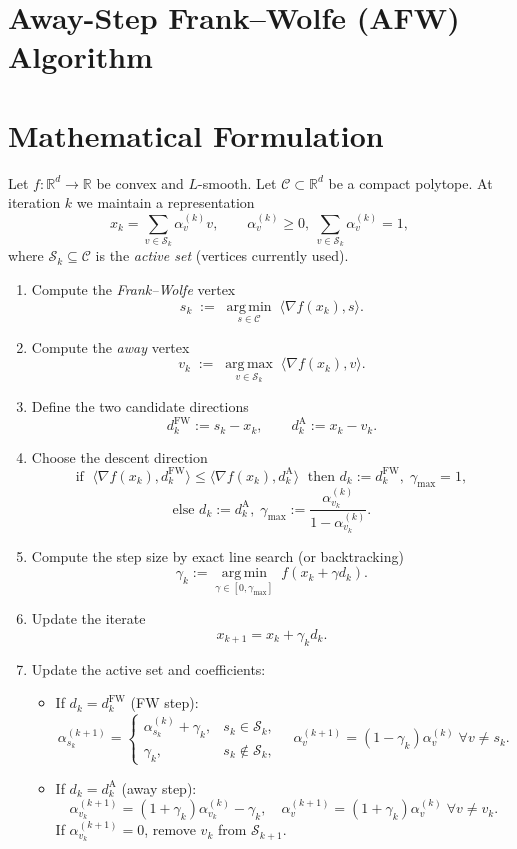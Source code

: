 \documentclass{article}
\newcommand{\cC}{\mathcal{C}}
\newcommand{\argmin}{\operatorname*{arg\,min}}
\newcommand{\argmax}{\operatorname*{arg\,max}}
\begin{document}
\section*{Away-Step Frank–Wolfe (AFW) Algorithm}

\section*{Mathematical Formulation}
Let $f:\mathbb{R}^d\to\mathbb{R}$ be convex and $L$-smooth.  
Let $\cC\subset\mathbb{R}^d$ be a compact polytope.  
At iteration $k$ we maintain a representation
\[
x_k=\sum_{v\in\mathcal{S}_k}\alpha_v^{(k)} v,\qquad
\alpha_v^{(k)}\ge 0,\ \sum_{v\in\mathcal{S}_k}\alpha_v^{(k)}=1,
\]
where $\mathcal{S}_k\subseteq\cC$ is the \emph{active set} (vertices currently used).

\begin{enumerate}[label=\textbf{Step \arabic*:}, leftmargin=*]
\item Compute the \emph{Frank–Wolfe} vertex
\[
s_k \;:=\; \argmin_{s\in\cC}\;\langle\nabla f(x_k),s\rangle .
\]
\item Compute the \emph{away} vertex
\[
v_k \;:=\; \argmax_{v\in\mathcal{S}_k}\;\langle\nabla f(x_k),v\rangle .
\]
\item Define the two candidate directions
\[
d^{\text{FW}}_k:=s_k-x_k,\qquad 
d^{\text{A}}_k:=x_k-v_k .
\]
\item Choose the descent direction
\[
\text{if }\;\langle\nabla f(x_k),d^{\text{FW}}_k\rangle\le 
\langle\nabla f(x_k),d^{\text{A}}_k\rangle
\;\text{ then } d_k:=d^{\text{FW}}_k,\;\gamma_{\max}=1,
\]
\[
\text{else } d_k:=d^{\text{A}}_k,\;
\gamma_{\max}:=\frac{\alpha_{v_k}^{(k)}}{1-\alpha_{v_k}^{(k)}} .
\]
\item Compute the step size by exact line search (or backtracking)
\[
\gamma_k:=\argmin_{\gamma\in[0,\gamma_{\max}]}\;f(x_k+\gamma d_k).
\]
\item Update the iterate
\[
x_{k+1}=x_k+\gamma_k d_k .
\]
\item Update the active set and coefficients:
\begin{itemize}
\item If $d_k=d^{\text{FW}}_k$ (FW step): 
\[
\alpha_{s_k}^{(k+1)}=
\begin{cases}
\alpha_{s_k}^{(k)}+\gamma_k, & s_k\in\mathcal{S}_k,\\
\gamma_k, & s_k\notin\mathcal{S}_k,
\end{cases}
\quad
\alpha_v^{(k+1)}=(1-\gamma_k)\alpha_v^{(k)}\;\forall v\neq s_k .
\]
\item If $d_k=d^{\text{A}}_k$ (away step): 
\[
\alpha_{v_k}^{(k+1)}=(1+\gamma_k)\alpha_{v_k}^{(k)}-\gamma_k,
\quad
\alpha_v^{(k+1)}=(1+\gamma_k)\alpha_v^{(k)}\;\forall v\neq v_k .
\]
If $\alpha_{v_k}^{(k+1)}=0$, remove $v_k$ from $\mathcal{S}_{k+1}$.
\end{itemize}
\end{enumerate}
\end{document}
